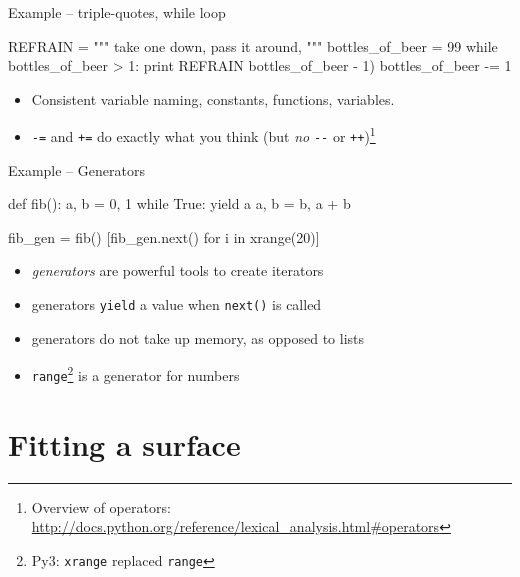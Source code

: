 \documentclass[xetex,10pt]{beamer}
\def\pythoni{\lstinline[language=pythontim]}
\def\spacer{\vspace*{1em}}
\newcommand{\pypypy}[1]{\footnote[frame]{Py3: #1}}
\begin{document}
\begin{frame}[fragile]{Example -- triple-quotes, while loop }
	\begin{python}[caption=\texttt{py102-example1c-while.py}]
REFRAIN = """
take one down, pass it around,
"""
bottles_of_beer = 99
while bottles_of_beer > 1:
    print REFRAIN %
        bottles_of_beer - 1)
    bottles_of_beer -= 1
\end{python}
	\spacer
	\pause
	\begin{itemize}
		\item Consistent variable naming, constants, functions, variables.
		\pause
		\item \pythoni{-=} and \pythoni{+=} do exactly what you think (but \emph{no} \pythoni{--} or \pythoni{++})\footnote[frame]{Overview of operators: \url{http://docs.python.org/reference/lexical_analysis.html\#operators}}
	\end{itemize}
\end{frame}

\begin{frame}[fragile]{Example -- Generators}
	\begin{python}[caption=\texttt{py102-example1d-generators.py}]
def fib():
    a, b = 0, 1
    while True:
        yield a
        a, b = b, a + b

fib_gen = fib()
[fib_gen.next() for i in xrange(20)]
\end{python}
	\spacer
	\pause
	\begin{itemize}
		\item \emph{generators} are powerful tools to create iterators
		\pause
		\item generators \pythoni{yield} a value when \pythoni{next()} is called
		\pause
		\item generators do not take up memory, as opposed to lists
		\pause
		\item \pythoni{range}\pypypy{\pythoni{xrange} replaced \pythoni{range}} is a generator for numbers
	\end{itemize}
\end{frame}

\section{Fitting a surface}
\end{document}
